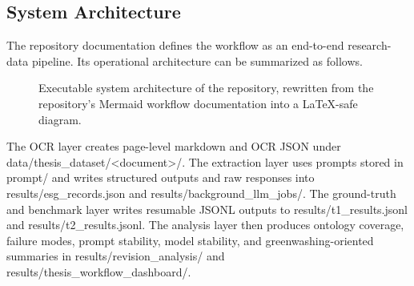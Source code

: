 \subsection{System Architecture}

The repository documentation defines the workflow as an end-to-end research-data pipeline. Its operational architecture can be summarized as follows.

\begin{figure}[ht]
\begin{center}
\end{center}
\caption{Executable system architecture of the repository, rewritten from the repository's Mermaid workflow documentation into a LaTeX-safe diagram.}
\label{fig:implementation-system-architecture}
\end{figure}


The OCR layer creates page-level markdown and OCR JSON under data/thesis\_dataset/<document>/. The extraction layer uses prompts stored in prompt/ and writes structured outputs and raw responses into results/esg\_records.json and results/background\_llm\_jobs/. The ground-truth and benchmark layer writes resumable JSONL outputs to results/t1\_results.jsonl and results/t2\_results.jsonl. The analysis layer then produces ontology coverage, failure modes, prompt stability, model stability, and greenwashing-oriented summaries in results/revision\_analysis/ and results/thesis\_workflow\_dashboard/.

